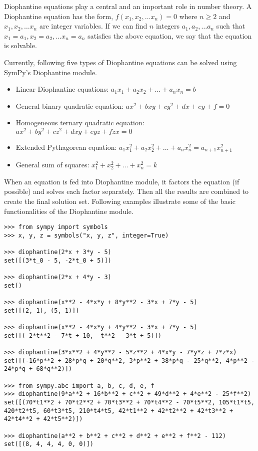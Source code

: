 Diophantine equations play a central and an important role in number theory.
A Diophantine equation has the form, $f(x_1, x_2, \ldots x_n) = 0$
where $n \geq 2$ and $x_1, x_2, \ldots x_n$ are integer variables. If we can find
$n$ integers $a_1, a_2, \ldots a_n$ such that $x_1 = a_1, x_2 = a_2, \ldots x_n = a_n$
satisfies the above equation, we say that the equation is solvable.

Currently, following five types of Diophantine equations can be solved using
SymPy's Diophantine module.

\begin{itemize}
    \item Linear Diophantine equations: $a_1x_1 + a_2x_2 + \ldots + a_nx_n = b$
    \item General binary quadratic equation: $ax^2 + bxy + cy^2 + dx + ey + f = 0$
    \item Homogeneous ternary quadratic equation: $ax^2 + by^2 + cz^2 + dxy + eyz + fzx = 0$
    \item Extended Pythagorean equation: $a_{1}x_{1}^2 + a_{2}x_{2}^2 + \ldots + a_{n}x_{n}^2 = a_{n+1}x_{n+1}^2$
    \item General sum of squares: $x_{1}^2 + x_{2}^2 + \ldots + x_{n}^2 = k$
\end{itemize}

When an equation is fed into Diophantine module, it factors the equation (if
possible) and solves each factor separately. Then all the results are combined to
create the final solution set. Following examples illustrate some of the basic
functionalities of the Diophantine module.

\begin{verbatim}
>>> from sympy import symbols
>>> x, y, z = symbols("x, y, z", integer=True)

>>> diophantine(2*x + 3*y - 5)
set([(3*t_0 - 5, -2*t_0 + 5)])

>>> diophantine(2*x + 4*y - 3)
set()

>>> diophantine(x**2 - 4*x*y + 8*y**2 - 3*x + 7*y - 5)
set([(2, 1), (5, 1)])

>>> diophantine(x**2 - 4*x*y + 4*y**2 - 3*x + 7*y - 5)
set([(-2*t**2 - 7*t + 10, -t**2 - 3*t + 5)])

>>> diophantine(3*x**2 + 4*y**2 - 5*z**2 + 4*x*y - 7*y*z + 7*z*x)
set([(-16*p**2 + 28*p*q + 20*q**2, 3*p**2 + 38*p*q - 25*q**2, 4*p**2 - 24*p*q + 68*q**2)])

>>> from sympy.abc import a, b, c, d, e, f
>>> diophantine(9*a**2 + 16*b**2 + c**2 + 49*d**2 + 4*e**2 - 25*f**2)
set([(70*t1**2 + 70*t2**2 + 70*t3**2 + 70*t4**2 - 70*t5**2, 105*t1*t5, 420*t2*t5, 60*t3*t5, 210*t4*t5, 42*t1**2 + 42*t2**2 + 42*t3**2 + 42*t4**2 + 42*t5**2)])

>>> diophantine(a**2 + b**2 + c**2 + d**2 + e**2 + f**2 - 112)
set([(8, 4, 4, 4, 0, 0)])
\end{verbatim}
